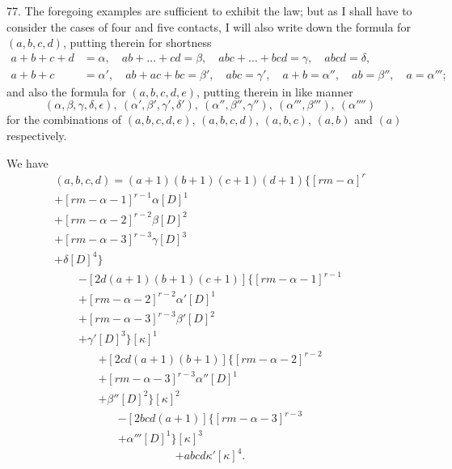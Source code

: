 \documentclass[12pt,a4paper]{article}
\begin{document}
77. The foregoing examples are sufficient to exhibit the law; but as I shall have to consider the cases of four and five contacts, I will also write down the formula for $(a, b, c, d)$, putting therein for shortness
\begin{align*}
a + b + c + d &= \alpha,\quad ab + \ldots + cd = \beta,\quad abc + \ldots + bcd = \gamma,\quad abcd = \delta,\\
a + b + c &= \alpha',\quad ab + ac + bc = \beta',\quad abc = \gamma',\quad a + b = \alpha'',\quad ab = \beta'',\quad a = \alpha''';
\end{align*}
and also the formula for $(a, b, c, d, e)$, putting therein in like manner
\[
(\alpha, \beta, \gamma, \delta, \epsilon),\ (\alpha', \beta', \gamma', \delta'),\ (\alpha'', \beta'', \gamma''),\ (\alpha''', \beta'''),\ (\alpha'''')
\]
for the combinations of $(a, b, c, d, e)$, $(a, b, c, d)$, $(a, b, c)$, $(a, b)$ and $(a)$ respectively.

We have
\begin{multline*}
(a, b, c, d) = (a+1)(b+1)(c+1)(d+1)\bigl\{[rm - \alpha]^r \\
+ [rm - \alpha - 1]^{r-1}\alpha[D]^1 \\
+ [rm - \alpha - 2]^{r-2}\beta[D]^2 \\
+ [rm - \alpha - 3]^{r-3}\gamma[D]^3 \\
+ \delta[D]^4\bigr\}
\end{multline*}
\begin{multline*}
- [2d(a+1)(b+1)(c+1)]\bigl\{[rm - \alpha - 1]^{r-1} \\
+ [rm - \alpha - 2]^{r-2}\alpha'[D]^1 \\
+ [rm - \alpha - 3]^{r-3}\beta'[D]^2 \\
+ \gamma'[D]^3\bigr\}[\kappa]^1
\end{multline*}
\begin{multline*}
+ [2cd(a+1)(b+1)]\bigl\{[rm - \alpha - 2]^{r-2} \\
+ [rm - \alpha - 3]^{r-3}\alpha''[D]^1 \\
+ \beta''[D]^2\bigr\}[\kappa]^2
\end{multline*}
\begin{multline*}
- [2bcd(a+1)]\bigl\{[rm - \alpha - 3]^{r-3} \\
+ \alpha'''[D]^1\bigr\}[\kappa]^3
\end{multline*}
\begin{equation*}
+ abcd\kappa'[\kappa]^4.
\end{equation*}
\end{document}
